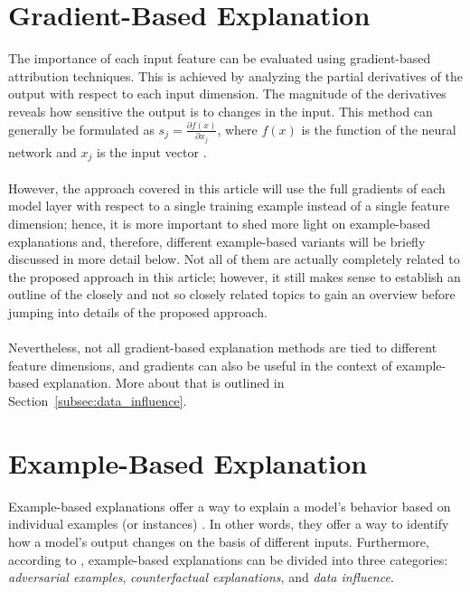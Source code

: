 \section{Gradient-Based Explanation}
The importance of each input feature can be evaluated using gradient-based attribution techniques. This is achieved by analyzing the partial derivatives of the output with respect to each input dimension. The magnitude of the derivatives reveals how sensitive the output is to changes in the input. This method can generally be formulated as $s_j=\frac{\partial f(x)}{\partial x_j}$, where $f(x)$ is the function of the neural network and $x_j$ is the input vector \cite{zhao2023explainabilitylargelanguagemodels}. 
\\\\
However, the approach covered in this article will use the full gradients of each model layer with respect to a single training example instead of a single feature dimension; hence, it is more important to shed more light on example-based explanations and, therefore, different example-based variants will be briefly discussed in more detail below. Not all of them are actually completely related to the proposed approach in this article; however, it still makes sense to establish an outline of the closely and not so closely related topics to gain an overview before jumping into details of the proposed approach.
\\\\
Nevertheless, not all gradient-based explanation methods are tied to different feature dimensions, and gradients can also be useful in the context of example-based explanation. More about that is outlined in Section~\ref{subsec:data_influence}.

\section{Example-Based Explanation}
Example-based explanations offer a way to explain a model's behavior based on individual examples (or instances) \cite{koh2020understandingblackboxpredictionsinfluence}. In other words, they offer a way to identify how a model's output changes on the basis of different inputs. Furthermore, according to \cite{zhao2023explainabilitylargelanguagemodels}, example-based explanations can be divided into three categories: \textit{adversarial examples}, \textit{counterfactual explanations}, and \textit{data influence}. 

